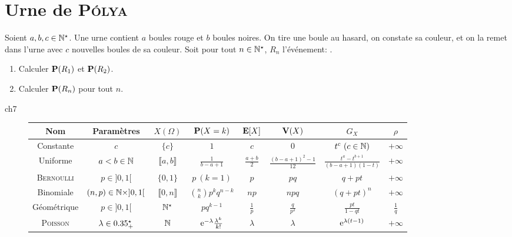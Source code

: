 \section{Urne de \textsc{Pólya}}
\begin{exercice}
    Soient $a, b, c \in \Ne$. Une urne contient $a$ boules rouge et $b$ boules noires. On tire une boule au hasard, on constate sa couleur, et on la remet dans l'urne avec $c$ nouvelles boules de sa couleur. Soit pour tout $n \in \Ne$, $R_n$ l'événement: .
    \begin{enumerate}
        \item Calculer $\P(R_1)$ et $\P(R_2)$.
        \item Calculer $\P(R_n)$ pour tout $n$.
    \end{enumerate}
\end{exercice}

\newpage

\cite{acamanes} ch7
\begin{figure*}
    \begingroup
    \renewcommand{\arraystretch}{1.5} %
    \begin{tabular}{|c|c|c|c|c|c|c|c|}
        \hline
        Nom & Paramètres & $X(\Omega)$ & $\P(X=k)$ & $\E[X]$ & $\V(X)$ & $G_X$ & $\rho$\\
        \hline \hline
        Constante & $c$ & $\{c\}$ & $1$ & $c$ & $0$ & $t^c\ (c \in \N)$ & $+\infty$ \\
        \hline
        Uniforme & $a < b \in \N$ & $\llbracket a, b \rrbracket$ & $\frac{1}{b-a+1}$ & $\frac{a+b}{2}$ & $\frac{(b-a+1)^2 - 1}{12}$ & $\frac{t^a - t^{b+1}}{(b-a+1)(1-t)}$ & $+\infty$ \\
        \hline
        \textsc{Bernoulli} & $p \in ]0, 1[$ & $\{0, 1\}$ & $p\ (k=1)$ & $p$ & $pq$ & $q + pt$ & $+\infty$ \\
        \hline
        Binomiale & $(n, p) \in \N \times ]0, 1[$ & $\llbracket 0, n \rrbracket$ & $\binom{n}{k} p^k q^{n-k}$ & $np$ & $npq$ & $(q + pt)^n$ & $+\infty$ \\
        \hline
        Géométrique & $p \in ]0, 1[$ & $\Ne$ & $pq^{k-1}$ & $\frac{1}{p}$ & $\frac{q}{p^2}$ & $\frac{pt}{1-qt}$ & $\frac{1}{q}$ \\
        \hline
        \textsc{Poisson} & $\lambda \in \Rpe$ & $\N$ & $\me^{-\lambda} \frac{\lambda^k}{k!}$ & $\lambda$ & $\lambda$ & $\me^{\lambda(t-1)}$ & $+\infty$ \\
        \hline
    \end{tabular}
    \endgroup
\end{figure*}


